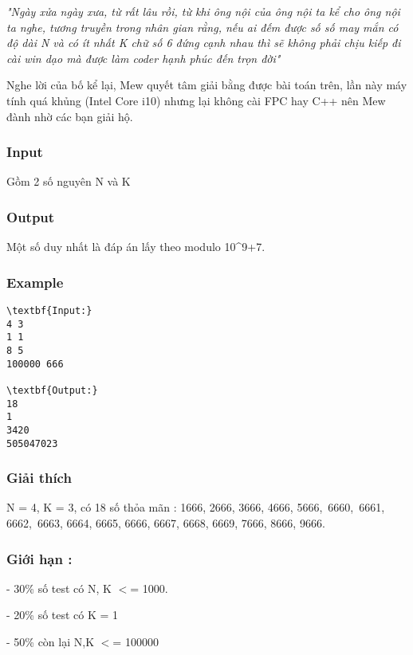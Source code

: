 

\emph{"Ngày xửa ngày xưa, từ rất lâu rồi, từ khi ông nội của ông nội ta kể cho ông nội ta nghe, tương truyền trong nhân gian rằng, nếu ai đếm được số số may mắn có độ dài N và có ít nhất K chữ số 6 đứng cạnh nhau thì sẽ không phải chịu kiếp đi cài win dạo mà được làm coder hạnh phúc đến trọn đời" }

Nghe lời của bố kể lại, Mew quyết tâm giải bằng được bài toán trên, lần này máy tính quá khủng (Intel Core i10) nhưng lại không cài FPC hay C++ nên Mew đành nhờ các bạn giải hộ.

\subsubsection{Input}

Gồm 2 số nguyên N và K

\subsubsection{Output}

Một số duy nhất là đáp án lấy theo modulo 10\textasciicircum9+7.

\subsubsection{Example}
\begin{verbatim}
\textbf{Input:}
4 3
1 1
8 5
100000 666

\textbf{Output:}
18
1
3420
505047023
\end{verbatim}

\subsubsection{Giải thích}

N = 4, K = 3, có 18 số thỏa mãn : 1666, 2666, 3666, 4666, 5666, 6660, 6661, 6662, 6663, 6664, 6665, 6666, 6667, 6668, 6669, 7666, 8666, 9666.

\subsubsection{Giới hạn :}

- 30\% số test có N, K $<$= 1000.

- 20\% số test có K = 1

- 50\% còn lại N,K $<$= 100000 